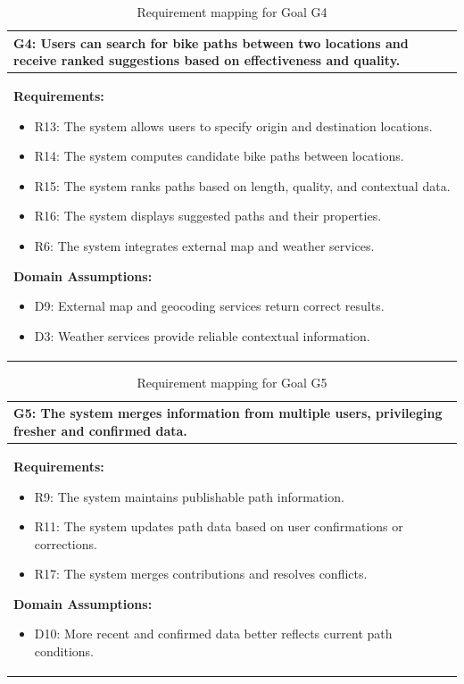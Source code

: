 \begin{table}[H]
\centering
\renewcommand{\arraystretch}{1.2}
\begin{tabular}{|p{}|}
\hline
\textbf{G4:} Users can search for bike paths between two locations and receive
ranked suggestions based on effectiveness and quality. \\ \hline

\textbf{Requirements:}
\begin{itemize}
  \item R13: The system allows users to specify origin and destination locations.
  \item R14: The system computes candidate bike paths between locations.
  \item R15: The system ranks paths based on length, quality, and contextual data.
  \item R16: The system displays suggested paths and their properties.
  \item R6: The system integrates external map and weather services.
\end{itemize}

\textbf{Domain Assumptions:}
\begin{itemize}
  \item D9: External map and geocoding services return correct results.
  \item D3: Weather services provide reliable contextual information.
\end{itemize}
\\ \hline
\end{tabular}
\caption{Requirement mapping for Goal G4}
\end{table}

\begin{table}[H]
\centering
\renewcommand{\arraystretch}{1.2}
\begin{tabular}{|p{}|}
\hline
\textbf{G5:} The system merges information from multiple users, privileging
fresher and confirmed data. \\ \hline

\textbf{Requirements:}
\begin{itemize}
  \item R9: The system maintains publishable path information.
  \item R11: The system updates path data based on user confirmations or corrections.
  \item R17: The system merges contributions and resolves conflicts.
\end{itemize}

\textbf{Domain Assumptions:}
\begin{itemize}
  \item D10: More recent and confirmed data better reflects current path conditions.
\end{itemize}
\\ \hline
\end{tabular}
\caption{Requirement mapping for Goal G5}
\end{table}

